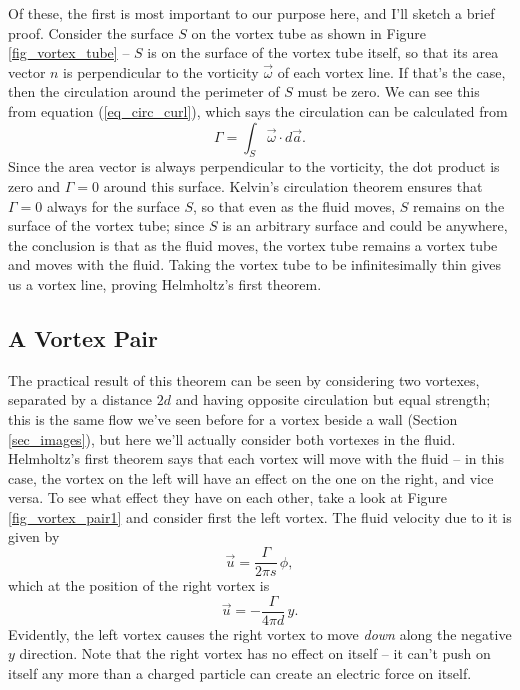 Of these, the first is most important to our purpose here, and I'll sketch a brief proof.  Consider the surface $S$ on the vortex tube as shown in Figure \ref{fig_vortex_tube} -- $S$ is on the surface of the vortex tube itself, so that its area vector $\unit{n}$ is perpendicular to the vorticity $\vec{\omega}$ of each vortex line.  If that's the case, then the circulation around the perimeter of $S$ must be zero. We can see this from equation (\ref{eq_circ_curl}), which says the circulation can be calculated from
\[
\Gamma = \int_S \vec{\omega} \cdot d\vec{a}.
\]
Since the area vector is always perpendicular to the vorticity, the dot product is zero and $\Gamma = 0$ around this surface.  Kelvin's circulation theorem ensures that $\Gamma = 0$ always for the surface $S$, so that even as the fluid moves, $S$ remains on the surface of the vortex tube; since $S$ is an arbitrary surface and could be anywhere, the conclusion is that as the fluid moves, the vortex tube remains a vortex tube and moves with the fluid.  Taking the vortex tube to be infinitesimally thin gives us a vortex line, proving Helmholtz's first theorem.


\subsection{A Vortex Pair}

The practical result of this theorem can be seen by considering two vortexes, separated by a distance $2d$ and having opposite circulation but equal strength; this is the same flow we've seen before for a vortex beside a wall (Section \ref{sec_images}), but here we'll actually consider both vortexes in the fluid.  Helmholtz's first theorem says that each vortex will move with the fluid -- in this case, the vortex on the left will have an effect on the one on the right, and vice versa.  To see what effect they have on each other, take a look at Figure \ref{fig_vortex_pair1} and consider first the left vortex.  The fluid velocity due to it is given by
\[
\vec{u} = \frac{\Gamma}{2\pi s} \, \unit{\phi},
\]
which at the position of the right vortex is
\[
\vec{u} = -\frac{\Gamma}{4\pi d} \, \unit{y}.
\]
Evidently, the left vortex causes the right vortex to move \emph{down} along the negative $y$ direction.  Note that the right vortex has no effect on itself -- it can't push on itself any more than a charged particle can create an electric force on itself. 

